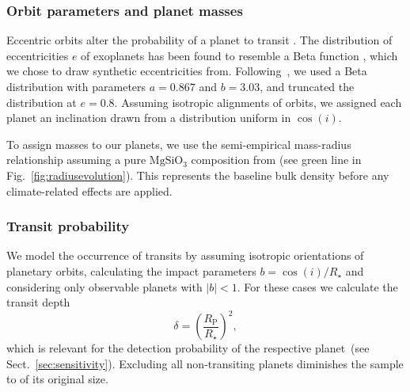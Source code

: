 \documentclass[modern]{aastex631}
\begin{document}
\subsubsection{Orbit parameters and planet masses}
Eccentric orbits alter the probability of a planet to transit \citep[e.g.,][]{Barnes2007a}.
The distribution of eccentricities $e$ of exoplanets has been found to resemble a Beta function \citep{Kipping2013b}, which we chose to draw synthetic eccentricities from.
Following~\citet{Kipping2013b}, we used a Beta distribution with parameters $a=0.867$ and $b=3.03$, and truncated the distribution at $e = 0.8$.
Assuming isotropic alignments of orbits, we assigned each planet an inclination drawn from a distribution uniform in $\cos(i)$.

To assign masses to our planets, we use the semi-empirical mass-radius relationship assuming a pure $\mathrm{MgSiO_3}$ composition from \citet{Zeng2016} (see green line in Fig.~\ref{fig:radiusevolution}).
This represents the baseline bulk density before any climate-related effects are applied.


\subsubsection{Transit probability}
We model the occurrence of transits by assuming isotropic orientations of planetary orbits, calculating the impact parameters $b = \cos(i)/R_\star$ and considering only observable planets with $|b| < 1$.
For these cases we calculate the transit depth
\begin{equation}\label{eq:transitdepth}
    \delta = \left( \frac{R_\mathrm{P}}{R_\star} \right)^2,
\end{equation}
which is relevant for the detection probability of the respective planet~(see Sect.~\ref{sec:sensitivity}).
Excluding all non-transiting planets diminishes the sample to  of its original size.
\end{document}
